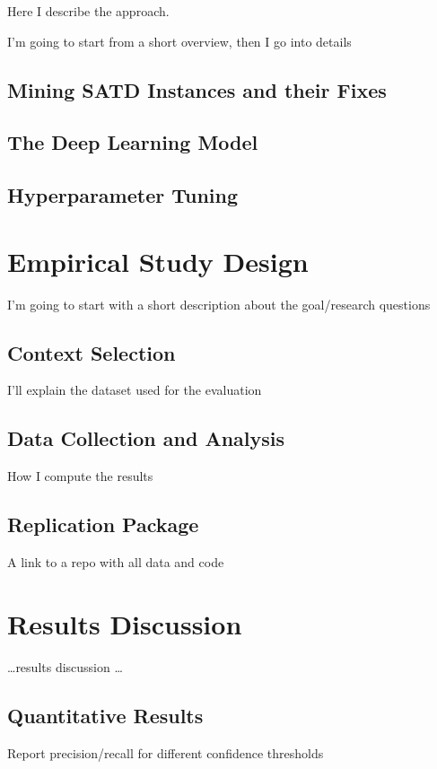 \documentclass[12pt, mscthesis]{usiinfthesis}
\begin{document}
Here I describe the approach. 

I'm going to start from a short overview, then I go into details

\section{Mining SATD Instances and their Fixes}
\lipsum[1-1]

\section{The Deep Learning Model}

\section{Hyperparameter Tuning}
\lipsum[1-1]

\chapter{Empirical Study Design}

I'm going to start with a short description  about the goal/research questions

\section{Context Selection}
I'll explain the dataset used for the evaluation
\lipsum[1-1]

\section{Data Collection and Analysis}
How I compute the results
\lipsum[1-1]

\section{Replication Package}
A link to a repo with all data and code

\lipsum[1-1]


\chapter{Results Discussion}

\dots results discussion \dots 

\section{Quantitative Results}
Report precision/recall for different confidence thresholds
\lipsum[1-1]
\end{document}
